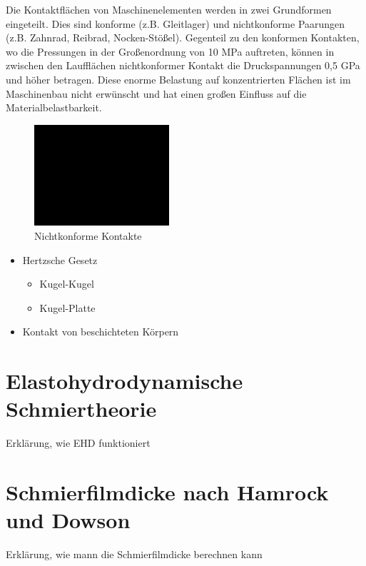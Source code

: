 Die Kontaktflächen von Maschinenelementen werden in zwei Grundformen eingeteilt.
Dies sind konforme (z.B. Gleitlager) und nichtkonforme Paarungen (z.B. Zahnrad, Reibrad, Nocken-Stößel).
Gegenteil zu den konformen Kontakten, wo die Pressungen in der Großenordnung von 10 MPa auftreten, können in zwischen den Laufflächen nichtkonformer Kontakt die Druckspannungen 0,5 GPa und höher betragen.
Diese enorme Belastung auf konzentrierten Flächen ist im Maschinenbau nicht erwünscht und hat einen großen Einfluss auf die Materialbelastbarkeit.
\begin{figure}[htb]
    \centering
    \includegraphics[width=5cm]{./images/blank_img.jpg}
    \caption{Nichtkonforme Kontakte}
    \label{fig:nichtkonforme_kontakte}
\end{figure}
%

\begin{itemize}
    \item Hertzsche Gesetz
        \begin{itemize}
            \item Kugel-Kugel
            \item Kugel-Platte
        \end{itemize}
    \item Kontakt von beschichteten Körpern
\end{itemize}

\section{Elastohydrodynamische Schmiertheorie}
\label{elastohydrodynamische_schmiertheorie}

Erklärung, wie EHD funktioniert

\section{Schmierfilmdicke nach Hamrock und Dowson}
\label{sec:schmierfilmdicke_nach_hamrock_und_dowson}
Erklärung, wie mann die Schmierfilmdicke berechnen kann
